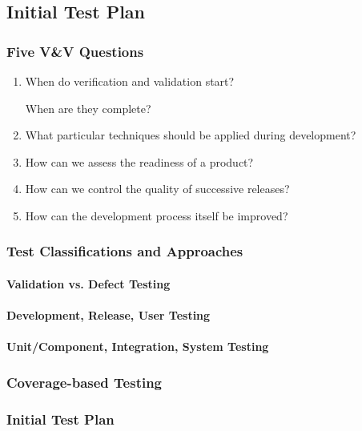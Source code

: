 \subsection{Initial Test Plan}

\subsubsection{Five V\&V Questions}

\begin{enumerate}
	\item When do verification and validation start?

	When are they complete?
	\item What particular techniques should be applied during development?
	\item How can we assess the readiness of a product?
	\item How can we control the quality of successive releases?
	\item How can the development process itself be improved?
\end{enumerate}

\subsubsection{Test Classifications and Approaches}

\paragraph{Validation vs. Defect Testing}

\paragraph{Development, Release, User Testing}

\paragraph{Unit/Component, Integration, System Testing}

\subsubsection{Coverage-based Testing}

\subsubsection{Initial Test Plan}
